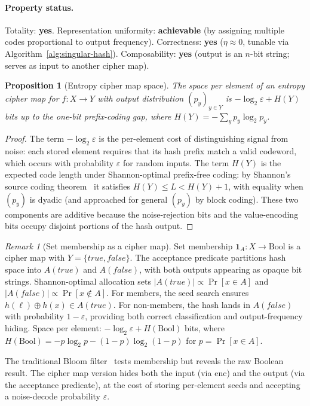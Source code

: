 \documentclass[11pt]{article}
\theoremstyle{definition}
\theoremstyle{plain}
\newtheorem{proposition}[theorem]{Proposition}
\theoremstyle{remark}
\newtheorem{remark}{Remark}[section]
\newcommand{\enc}{\mathrm{enc}}
\begin{document}
\paragraph{Property status.}
Totality: \textbf{yes}.  Representation uniformity: \textbf{achievable}
(by assigning multiple codes proportional to output frequency).
Correctness: \textbf{yes} ($\eta \approx 0$, tunable via
Algorithm~\ref{alg:singular-hash}).  Composability:
\textbf{yes} (output is an $n$-bit string; serves as input to another
cipher map).

\begin{proposition}[Entropy cipher map space]
\label{prop:entropy-space}
The space per element of an entropy cipher map for $f : X \to Y$ with
output distribution $(p_y)_{y \in Y}$ is
$-\log_2 \varepsilon + H(Y)$
bits up to the one-bit prefix-coding gap, where
$H(Y) = -\sum_y p_y \log_2 p_y$.
\end{proposition}

\begin{proof}
The term $-\log_2 \varepsilon$ is the per-element cost of distinguishing
signal from noise: each stored element requires that its hash prefix match a
valid codeword, which occurs with probability $\varepsilon$ for random
inputs.  The term $H(Y)$ is the expected code length under
Shannon-optimal prefix-free coding: by Shannon's source coding
theorem~\cite{shannon1948mathematical} it satisfies $H(Y) \le L < H(Y)+1$,
with equality when $(p_y)$ is dyadic (and approached for general $(p_y)$
by block coding).  These two components are
additive because the noise-rejection bits and the value-encoding bits occupy
disjoint portions of the hash output.
\end{proof}

\begin{remark}[Set membership as a cipher map]
\label{rem:membership}
Set membership $\mathbf{1}_A : X \to \mathrm{Bool}$ is a cipher map
with $Y = \{\mathit{true}, \mathit{false}\}$.  The acceptance predicate
partitions hash space into $A(\mathit{true})$ and $A(\mathit{false})$,
with both outputs appearing as opaque bit strings.  Shannon-optimal
allocation sets $|A(\mathit{true})| \propto \Pr[x \in A]$ and
$|A(\mathit{false})| \propto \Pr[x \notin A]$.  For members, the seed
search ensures $h(\ell) \oplus h(x) \in A(\mathit{true})$.  For
non-members, the hash lands in $A(\mathit{false})$ with probability
$1 - \varepsilon$, providing both correct classification and
output-frequency hiding.  Space per element:
$-\log_2 \varepsilon + H(\mathrm{Bool})$ bits, where
$H(\mathrm{Bool}) = -p \log_2 p - (1\!-\!p) \log_2(1\!-\!p)$ for
$p = \Pr[x \in A]$.

The traditional Bloom filter~\cite{bloom1970space} tests membership but
reveals the raw Boolean result.  The cipher map version hides both the
input (via $\enc$) and the output (via the acceptance predicate), at the
cost of storing per-element seeds and accepting a noise-decode probability
$\varepsilon$.
\end{remark}
\end{document}
